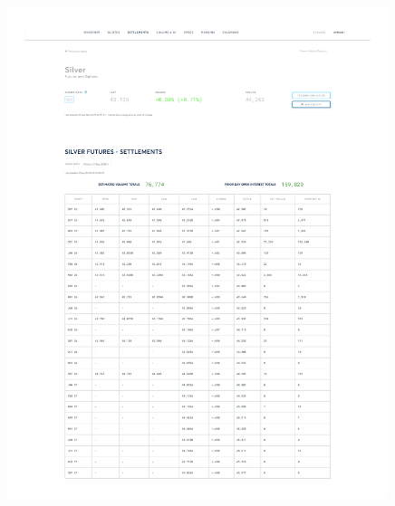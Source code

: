 \documentclass[10pt,a4paper]{article} %
\begin{document}
\begin{figure}[h]
  \centering
  \includegraphics[width=0.99\textwidth]{appendix/SILVER12SEP.pdf}
  \label{fig:silver_settlements}
\end{figure}
\end{document}
